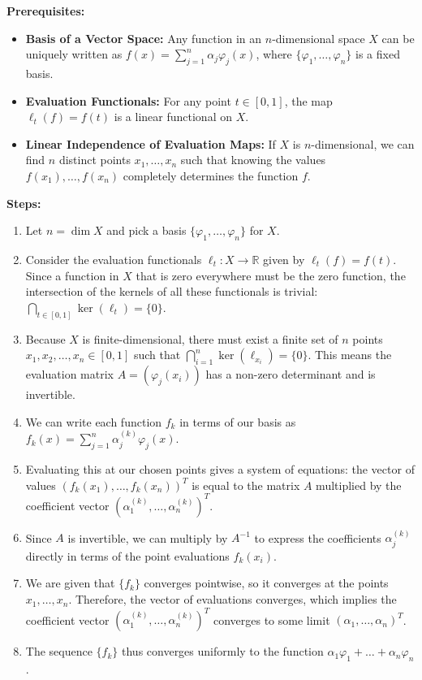 \begin{solution}
\textbf{Prerequisites:}
\begin{itemize}
    \item \textbf{Basis of a Vector Space:} Any function in an $n$-dimensional space $X$ can be uniquely written as $f(x) = \sum_{j=1}^n \alpha_j \varphi_j(x)$, where $\{\varphi_1, \dots, \varphi_n\}$ is a fixed basis.
    \item \textbf{Evaluation Functionals:} For any point $t \in [0,1]$, the map $\ell_t(f) = f(t)$ is a linear functional on $X$.
    \item \textbf{Linear Independence of Evaluation Maps:} If $X$ is $n$-dimensional, we can find $n$ distinct points $x_1, \dots, x_n$ such that knowing the values $f(x_1), \dots, f(x_n)$ completely determines the function $f$.
\end{itemize}

\textbf{Steps:}
\begin{enumerate}
    \item Let $n = \dim X$ and pick a basis $\{\varphi_1, \dots, \varphi_n\}$ for $X$.
    \item Consider the evaluation functionals $\ell_t: X \to \mathbb{R}$ given by $\ell_t(f) = f(t)$. Since a function in $X$ that is zero everywhere must be the zero function, the intersection of the kernels of all these functionals is trivial: $\bigcap_{t \in [0,1]} \ker(\ell_t) = \{0\}$.
    \item Because $X$ is finite-dimensional, there must exist a finite set of $n$ points $x_1, x_2, \dots, x_n \in [0,1]$ such that $\bigcap_{i=1}^n \ker(\ell_{x_i}) = \{0\}$. This means the evaluation matrix $A = (\varphi_j(x_i))$ has a non-zero determinant and is invertible.
    \item We can write each function $f_k$ in terms of our basis as $f_k(x) = \sum_{j=1}^n \alpha_j^{(k)} \varphi_j(x)$.
    \item Evaluating this at our chosen points gives a system of equations: the vector of values $(f_k(x_1), \dots, f_k(x_n))^T$ is equal to the matrix $A$ multiplied by the coefficient vector $(\alpha_1^{(k)}, \dots, \alpha_n^{(k)})^T$.
    \item Since $A$ is invertible, we can multiply by $A^{-1}$ to express the coefficients $\alpha_j^{(k)}$ directly in terms of the point evaluations $f_k(x_i)$.
    \item We are given that $\{f_k\}$ converges pointwise, so it converges at the points $x_1, \dots, x_n$. Therefore, the vector of evaluations converges, which implies the coefficient vector $(\alpha_1^{(k)}, \dots, \alpha_n^{(k)})^T$ converges to some limit $(\alpha_1, \dots, \alpha_n)^T$.
    \item The sequence $\{f_k\}$ thus converges uniformly to the function $\alpha_1 \varphi_1 + \dots + \alpha_n \varphi_n$.
\end{enumerate}


\end{solution}
